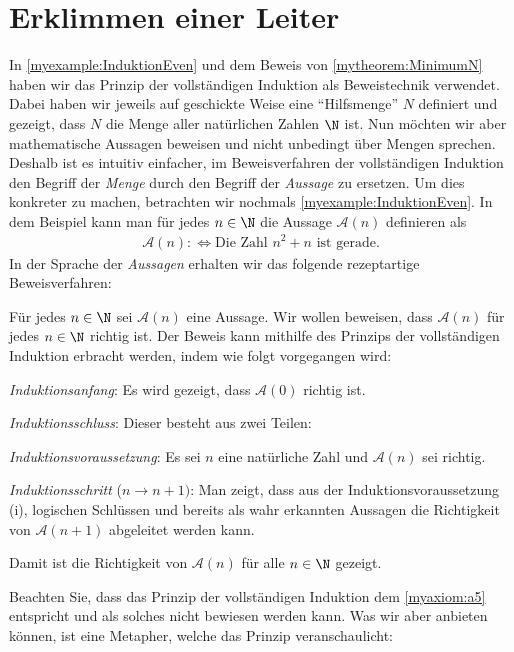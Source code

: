 \section{Erklimmen einer Leiter}
In \cref{myexample:InduktionEven} und dem Beweis von \cref{mytheorem:MinimumN} haben wir das Prinzip der vollständigen Induktion als Beweistechnik verwendet. Dabei haben wir jeweils auf geschickte Weise eine \enquote{Hilfsmenge} $N$ definiert und gezeigt, dass $N$ die Menge aller natürlichen Zahlen $\N$ ist. Nun möchten wir aber mathematische Aussagen beweisen und nicht unbedingt über Mengen sprechen. Deshalb ist es intuitiv einfacher, im Beweisverfahren der vollständigen Induktion den Begriff der \textit{Menge} durch den Begriff der \textit{Aussage} zu ersetzen. Um dies konkreter zu machen, betrachten wir nochmals \cref{myexample:InduktionEven}. In dem Beispiel kann man für jedes $n\in\N$ die Aussage $\mathcal{A}(n)$ definieren als
\begin{align*}
	\mathcal{A}(n) :\iff \text{Die Zahl $n^2 + n$ ist gerade}.
\end{align*}
In der Sprache der \textit{Aussagen} erhalten wir das folgende rezeptartige Beweisverfahren:
\begin{mysummary}\label{mysummary:Induktion}

	Für jedes $n\in\N$ sei $\mathcal{A}(n)$ eine Aussage. Wir wollen beweisen, dass $\mathcal{A}(n)$ für jedes $n\in\N$ richtig ist. Der Beweis kann mithilfe des Prinzips der vollständigen Induktion erbracht werden, indem wie folgt vorgegangen wird:
	\begin{aenum}
		\item \textit{Induktionsanfang}: Es wird gezeigt, dass $\mathcal{A}(0)$ richtig ist.
		\item \textit{Induktionsschluss}: Dieser besteht aus zwei Teilen:
		\begin{renum}
			\item \textit{Induktionsvoraussetzung}: Es sei $n$ eine natürliche Zahl und $\mathcal{A}(n)$ sei richtig.
			\item \textit{Induktionsschritt} ($n\to n+1)$: Man zeigt, dass aus der Induktionsvoraussetzung (i), logischen Schlüssen und bereits als wahr erkannten Aussagen die Richtigkeit von $\mathcal{A}(n+1)$ abgeleitet werden kann.
		\end{renum}
	\end{aenum}
	Damit ist die Richtigkeit von $\mathcal{A}(n)$ für alle $n\in\N$ gezeigt.
\end{mysummary}
Beachten Sie, dass das Prinzip der vollständigen Induktion dem \cref{myaxiom:a5} entspricht und als solches nicht bewiesen werden kann. Was wir aber anbieten können, ist eine Metapher, welche das Prinzip veranschaulicht:

